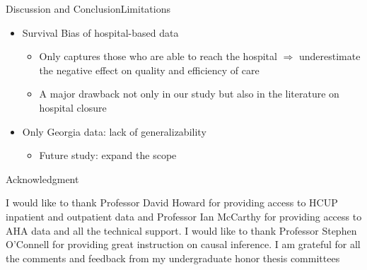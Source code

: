 \documentclass{beamer}
\theoremstyle{definition}
\begin{document}
\begin{frame}{Discussion and Conclusion}{Limitations}

\begin{itemize}
\setlength{\itemsep}{15pt}
    \item Survival Bias of hospital-based data
    \begin{itemize}
    \setlength{\itemsep}{7pt}
        \item Only captures those who are able to reach the hospital $\Rightarrow$ underestimate the negative effect on quality and efficiency of care
        \item A major drawback not only in our study but also in the literature on hospital closure
    \end{itemize}
    \item Only Georgia data: lack of generalizability 
    \begin{itemize}
        \item Future study: expand the scope
    \end{itemize}
\end{itemize}
    
\end{frame}



\begin{frame}{Acknowledgment}

I would like to thank Professor David Howard for providing access to HCUP inpatient and outpatient data and Professor Ian McCarthy for providing access to AHA data and all the technical support. I would like to thank Professor Stephen O'Connell for providing great instruction on causal inference. I am grateful for all the comments and feedback from my undergraduate honor thesis committees

\end{frame}
\end{document}
